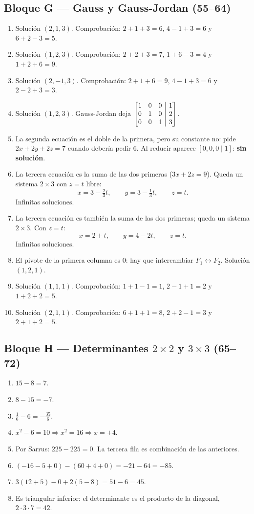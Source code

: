 \documentclass[12pt, letterpaper]{article}
\makeatletter
\newcommand{\mwaug}[2]{\ensuremath{\left[\begin{array}{@{}#1@{}}#2\end{array}\right]}}
\makeatother
\begin{document}
\subsection*{Bloque G — Gauss y Gauss-Jordan (55--64)}
\begin{enumerate}[label=\textbf{\arabic*.}, start=55, leftmargin=*]
  \item Solución $(2,1,3)$. Comprobación: $2+1+3=6$, $4-1+3=6$ y
        $6+2-3=5$.
  \item Solución $(1,2,3)$. Comprobación: $2+2+3=7$, $1+6-3=4$ y
        $1+2+6=9$.
  \item Solución $(2,-1,3)$. Comprobación: $2+1+6=9$, $4-1+3=6$ y
        $2-2+3=3$.
  \item Solución $(1,2,3)$. Gauss-Jordan deja
        $\mwaug{ccc|c}{1&0&0&1\\0&1&0&2\\0&0&1&3}$.
  \item La segunda ecuación es el doble de la primera, pero su constante no:
        pide $2x+2y+2z=7$ cuando debería pedir $6$. Al reducir aparece
        $[0,0,0\mid1]$: \textbf{sin solución}.
  \item La tercera ecuación es la suma de las dos primeras
        ($3x+2z=9$). Queda un sistema $2\times3$ con $z=t$ libre:
        \[
          x=3-\tfrac23t,\qquad y=3-\tfrac13t,\qquad z=t.
        \]
        Infinitas soluciones.
  \item La tercera ecuación es también la suma de las dos primeras; queda
        un sistema $2\times3$. Con $z=t$:
        \[
          x=2+t,\qquad y=4-2t,\qquad z=t.
        \]
        Infinitas soluciones.
  \item El pivote de la primera columna es $0$: hay que intercambiar
        $F_1\leftrightarrow F_2$. Solución $(1,2,1)$.
  \item Solución $(1,1,1)$. Comprobación: $1+1-1=1$, $2-1+1=2$ y
        $1+2+2=5$.
  \item Solución $(2,1,1)$. Comprobación: $6+1+1=8$, $2+2-1=3$ y
        $2+1+2=5$.
\end{enumerate}

\subsection*{Bloque H — Determinantes $2\times2$ y $3\times3$ (65--72)}
\begin{enumerate}[label=\textbf{\arabic*.}, start=65, leftmargin=*]
  \item $15-8=7$.
  \item $8-15=-7$.
  \item $\tfrac16-6=-\tfrac{35}{6}$.
  \item $x^2-6=10\Rightarrow x^2=16\Rightarrow x=\pm4$.
  \item Por Sarrus: $225-225=0$. La tercera fila es combinación de las
        anteriores.
  \item $(-16-5+0)-(60+4+0)=-21-64=-85$.
  \item $3(12+5)-0+2(5-8)=51-6=45$.
  \item Es triangular inferior: el determinante es el producto de la
        diagonal, $2\cdot3\cdot7=42$.
\end{enumerate}
\end{document}
